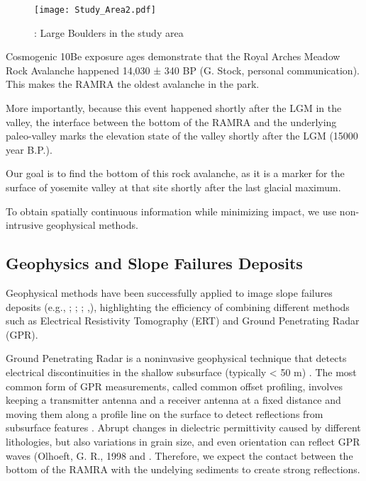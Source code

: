 \documentclass[5p]{elsarticle}
\begin{document}
                 
                                    \begin{figure}[h]

	\texttt{[image: Study\_Area2.pdf]}
		\caption{: Large Boulders in the study area  \label{Study_Area2}}

								   \end{figure}



Cosmogenic 10Be exposure ages demonstrate that the Royal Arches Meadow Rock Avalanche happened 14,030 ± 340 BP (G. Stock, personal communication). This makes the RAMRA the oldest avalanche in the park.
                 
More importantly, because this event happened shortly after the LGM in the valley, the interface between the bottom of the RAMRA and the underlying paleo-valley marks the elevation state of the valley shortly after the LGM (15000 year B.P.).

Our goal is to find the bottom of this rock avalanche, as it is a marker for the surface of yosemite valley at that site shortly after the last glacial maximum.

To obtain spatially continuous information while minimizing impact, we use non-intrusive geophysical methods.                  
\bigskip

                 
                 
\subsection{Geophysics and Slope Failures Deposits}
                 
Geophysical methods have been successfully applied to image slope failures deposits (e.g., \cite{sass2006determination}; \cite{otto2006comparing}; \cite{socco2010geophysical}; \cite{brody2015near},\cite{liu2018near}), highlighting the efficiency of combining different methods such as Electrical Resistivity Tomography (ERT) and Ground Penetrating Radar (GPR). 
                 
Ground Penetrating Radar is a noninvasive geophysical technique that detects electrical discontinuities in the shallow subsurface (typically < 50 m) \citep{neal2004ground}. The most common form of GPR measurements, called common offset profiling, involves keeping a transmitter antenna and a receiver antenna at a fixed distance and moving them along a profile line on the surface to detect reflections from subsurface features \citep{jol2008ground}. Abrupt changes in dielectric permittivity caused by different lithologies, but also variations in grain size, and even orientation can reflect GPR waves (Olhoeft, G. R., 1998 and \citep{neal2004ground}. Therefore, we expect the contact between the bottom of the RAMRA with the undelying sediments to create strong reflections.           
\end{document}
